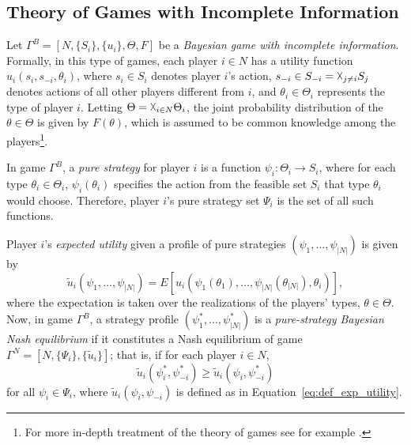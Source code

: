 \subsection{Theory of Games with Incomplete Information} %
\label{sub:notation_theory_of_games_with_incomplete_information}
Let $\Gamma^B = [N, \{S_i\}, \{u_i\},\Theta,F]$ be a \emph{Bayesian game with incomplete information}. Formally, in this type of games, each player $i\in N$ has a utility function $u_i(s_i, s_{-i}, \theta_i)$, where $s_i\in S_i$ denotes player $i$'s action, $s_{-i}\in S_{-i} = \vartimes_{j\neq i}S_j$ denotes actions of all other players different from $i$, and $\theta_i\in\Theta_i$ represents the type of player $i$. Letting $\Theta = \vartimes_{i\in N} \Theta_i$, the joint probability distribution of the $\theta\in\Theta$ is given by $F(\theta)$, which is assumed to be common knowledge among the players\footnote{For more in-depth treatment of the theory of games see for example \cite{Myerson97, Gibbons92, MicroTheory}.}.

In game $\Gamma^B$, a \emph{pure strategy} for player $i$ is a function $\psi_i: \Theta_i\to S_i$, where for each type $\theta_i\in \Theta_i$, $\psi_i(\theta_i)$ specifies the action from the feasible set $S_i$ that type $\theta_i$ would choose. Therefore, player $i$'s pure strategy set $\Psi_i$ is the set of all such functions.

Player $i$'s \emph{expected utility} given a profile of pure strategies $(\psi_1,\ldots,\psi_{|N|})$ is given by
\begin{equation}
	\label{eq:def_exp_utility}
	\tilde{u}_i(\psi_1,\ldots,\psi_{|N|}) = E[u_i(\psi_1(\theta_1),\ldots,\psi_{|N|}(\theta_{|N|}),\theta_i)],
\end{equation}
where the expectation is taken over the realizations of the players' types, $\theta\in\Theta$. Now, in game $\Gamma^B$, a strategy profile $(\psi_1^*,\ldots,\psi_{|N|}^*)$ is a \emph{pure-strategy Bayesian Nash equilibrium} if it constitutes a Nash equilibrium of game $\Gamma^N = [N, \{\Psi_i\},\{\tilde{u}_i\}]$; that is, if for each player $i\in N$,
\begin{equation}
	\label{eq:def_bayesian_nash_eq}
	\tilde{u}_i(\psi^*_i,\psi^*_{-i}) \ge \tilde{u}_i(\psi_i,\psi^*_{-i})
\end{equation}
for all $\psi_i\in\Psi_i$, where $\tilde{u}_i(\psi_i,\psi_{-i})$ is defined as in Equation~\eqref{eq:def_exp_utility}.

